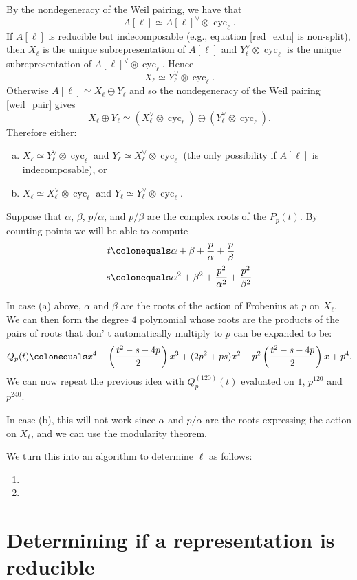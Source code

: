 \documentclass[11pt]{amsart}
\newcommand{\cyc}{\operatorname{cyc}}
\theoremstyle{definition}
\theoremstyle{remark}
\begin{document}
By the nondegeneracy of the Weil pairing, we have that
\begin{equation}\label{weil_pair}A[\ell] \simeq A[\ell]^\vee \otimes \cyc_\ell.\end{equation}
If $A[\ell]$ is reducible but indecomposable (e.g., equation \eqref{red_extn} is non-split), then $X_{\ell}$ is the unique subrepresentation of $A[\ell]$ and $Y_\ell^\vee \otimes \cyc_{\ell}$ is the unique subrepresentation of $A[\ell]^\vee \otimes \cyc_\ell$.  Hence
\[ X_\ell \simeq Y_\ell^\vee \otimes \cyc_\ell.\]
Otherwise $A[\ell] \simeq X_\ell \oplus Y_\ell$ and so the nondegeneracy of the Weil pairing \eqref{weil_pair} gives
\[X_\ell \oplus Y_\ell \simeq \left(X_\ell^\vee \otimes \cyc_\ell\right) \oplus \left(Y_\ell^\vee \otimes \cyc_\ell\right).\]
Therefore either:
\begin{enumerate}[(a)]
\item $X_\ell \simeq Y_\ell^\vee \otimes \cyc_\ell$ and $Y_\ell\simeq X_\ell^\vee \otimes \cyc_\ell$ (the only possibility if $A[\ell]$ is indecomposable), or 
\item $X_\ell \simeq X_\ell^\vee \otimes \cyc_\ell$ and $Y_\ell \simeq Y_\ell^\vee \otimes \cyc_\ell$.
\end{enumerate}

Suppose that $\alpha$, $\beta$, $p/\alpha$, and $p/\beta$ are the complex roots of the $P_p(t)$.  By counting points we will be able to compute
\begin{align*}
t &\colonequals \alpha + \beta + \frac{p}{\alpha} + \frac{p}{\beta} \\
s &\colonequals \alpha^2 + \beta^2 + \frac{p^2}{\alpha^2} + \frac{p^2}{\beta^2} 
\end{align*}

In case (a) above, $\alpha$ and $\beta$ are the roots of the action of Frobenius at $p$ on $X_\ell$.  We can then form the degree $4$ polynomial whose roots are the products of the pairs of roots that don'
t automatically multiply to $p$ can be expanded to be:
\[Q_p(t) \colonequals x^4 - \left( \frac{t^2 - s - 4p}{2} \right) x^3 + (2p^2 + ps)x^2 - p^2\left( \frac{t^2 - s - 4p}{2} \right)x + p^4.\]
We can now repeat the previous idea with $Q_p^{(120)}(t)$ evaluated on $1$, $p^{120}$ and $p^{240}$.

In case (b), this will not work since $\alpha$ and $p/\alpha$ are the roots expressing the action on $X_\ell$, and we can use the modularity theorem.

We turn this into an algorithm to determine $\ell$ as follows:
\begin{enumerate}
\item
\item
\end{enumerate}


\section{Determining if a representation is reducible}\label{test_ell}
\end{document}
